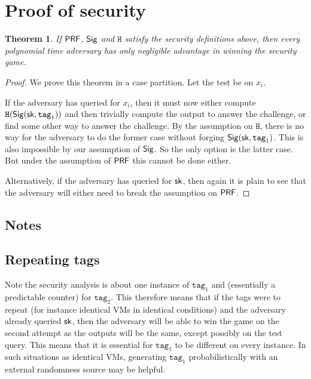 \documentclass[12pt]{article}
\newtheorem{theorem}{Theorem}[section]
\begin{document}
\section{Proof of security} \label{proof}

\begin{theorem}
If $\mathsf{PRF}$, $\mathsf{Sig}$ and $\texttt{H}$ satisfy the security definitions above, then every polynomial time adversary has only negligible advantage in winning the security game.
\end{theorem}

\begin{proof}
We prove this theorem in a case partition. Let the test be on $x_i$.

If the adversary has queried for $x_i$, then it must now either compute $\texttt{H}(\mathsf{Sig}(\mathsf{sk}, \texttt{tag}_1))$ and then trivially compute the output to answer the challenge, or find some other way to answer the challenge. By the assumption on $\texttt{H}$, there is no way for the adversary to do the former case without forging $\mathsf{Sig} (\mathsf{sk}, \texttt{tag}_1)$. This is also impossible by our assumption of $\mathsf{Sig}$.	So the only option is the latter case. But under the assumption of $\mathsf{PRF}$ this cannot be done either.


Alternatively, if the adversary has queried for $\mathsf{sk}$, then again it is plain to see that the adversary will either need to break the assumption on $\mathsf{PRF}$.
\end{proof}

\subsection{Notes}

\subsection{Repeating tags}
Note the security analysis is about one instance of $\texttt{tag}_1$ and (essentially a predictable counter) for $\texttt{tag}_2$. This therefore means that if the tags were to repeat (for instance identical VMs in identical conditions) and the adversary already queried $\mathsf{sk}$, then the adversary will be able to win the game on the second attempt as the outputs will be the same, except possibly on the test query. This means that it is essential for $\texttt{tag}_1$ to be different on every instance. In such situations as identical VMs, generating $\texttt{tag}_1$ probabilistically with an external randomness source may be helpful.
\end{document}
